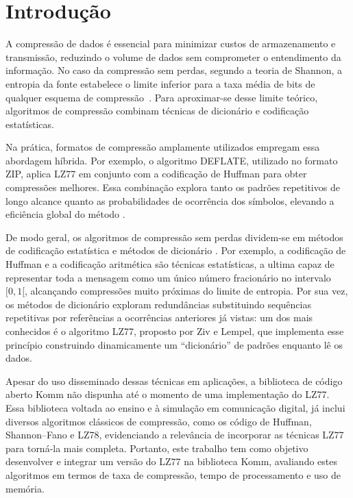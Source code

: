\chapter{Introdução}\label{cap:introducao}
A compressão de dados é essencial para minimizar custos de armazenamento e
transmissão, reduzindo o volume de dados sem comprometer o entendimento da
informação. No caso da compressão sem perdas, segundo a teoria de Shannon, a
entropia da fonte estabelece o limite inferior para a taxa média de bits de
qualquer esquema de compressão~\cite{mackay2003information}. Para aproximar-se
desse limite teórico, algoritmos de compressão combinam técnicas de dicionário
e codificação estatísticas.

Na prática, formatos de compressão amplamente utilizados empregam essa
abordagem híbrida. Por exemplo, o algoritmo DEFLATE, utilizado no formato ZIP,
aplica LZ77 em conjunto com a codificação de Huffman para obter compressões
melhores. Essa combinação explora tanto os padrões repetitivos de longo alcance
quanto as probabilidades de ocorrência dos símbolos, elevando a eficiência
global do método \cite{rfc1951}.

De modo geral, os algoritmos de compressão sem perdas dividem-se em métodos de
codificação estatística e métodos de dicionário \cite{sayood2012introduction}.
Por exemplo, a codificação de Huffman e a codificação aritmética são técnicas
estatísticas, a ultima capaz de representar toda a mensagem como um único
número fracionário no intervalo $[0, 1[$, alcançando compressões muito próximas
do limite de entropia. Por sua vez, os métodos de dicionário exploram
redundâncias substituindo sequências repetitivas por referências a ocorrências
anteriores já vistas: um dos mais conhecidos é o algoritmo LZ77, proposto por
Ziv e Lempel\cite{1055714}, que implementa esse princípio construindo
dinamicamente um ``dicionário'' de padrões enquanto lê os dados.

Apesar do uso disseminado dessas técnicas em aplicações, a biblioteca de código
aberto Komm não dispunha até o momento de uma implementação do LZ77. Essa biblioteca voltada ao ensino e à simulação em
comunicação digital, já inclui diversos algoritmos clássicos de compressão,
como os código de Huffman, Shannon--Fano e LZ78, evidenciando a relevância de
incorporar as técnicas LZ77 para torná-la mais
completa. Portanto, este trabalho tem como objetivo desenvolver e integrar um
versão do LZ77 na biblioteca Komm, avaliando estes
algoritmos em termos de taxa de compressão, tempo de processamento e uso de
memória.

